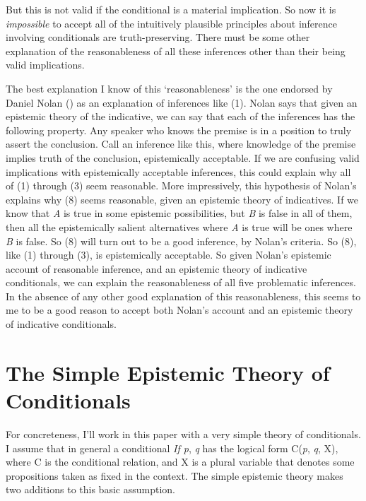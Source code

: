 \documentclass[
  10pt,
  letterpaper,
  DIV=11,
  numbers=noendperiod,
  twoside]{scrartcl}
\begin{document}
But this is not valid if the conditional is a material implication. So
now it is \emph{impossible} to accept all of the intuitively plausible
principles about inference involving conditionals are truth-preserving.
There must be some other explanation of the reasonableness of all these
inferences other than their being valid implications.

The best explanation I know of this `reasonableness' is the one endorsed
by Daniel Nolan () as an explanation of
inferences like (1). Nolan says that given an epistemic theory of the
indicative, we can say that each of the inferences has the following
property. Any speaker who knows the premise is in a position to truly
assert the conclusion. Call an inference like this, where knowledge of
the premise implies truth of the conclusion, epistemically acceptable.
If we are confusing valid implications with epistemically acceptable
inferences, this could explain why all of (1) through (3) seem
reasonable. More impressively, this hypothesis of Nolan's explains why
(8) seems reasonable, given an epistemic theory of indicatives. If we
know that \emph{A} is true in some epistemic possibilities, but \emph{B}
is false in all of them, then all the epistemically salient alternatives
where \emph{A} is true will be ones where \emph{B} is false. So (8) will
turn out to be a good inference, by Nolan's criteria. So (8), like (1)
through (3), is epistemically acceptable. So given Nolan's epistemic
account of reasonable inference, and an epistemic theory of indicative
conditionals, we can explain the reasonableness of all five problematic
inferences. In the absence of any other good explanation of this
reasonableness, this seems to me to be a good reason to accept both
Nolan's account and an epistemic theory of indicative conditionals.

\section{The Simple Epistemic Theory of
Conditionals}\label{the-simple-epistemic-theory-of-conditionals}

For concreteness, I'll work in this paper with a very simple theory of
conditionals. I assume that in general a conditional \emph{If p},
\emph{q} has the logical form C(\emph{p}, \emph{q}, X), where C is the
conditional relation, and X is a plural variable that denotes some
propositions taken as fixed in the context. The simple epistemic theory
makes two additions to this basic assumption.
\end{document}
